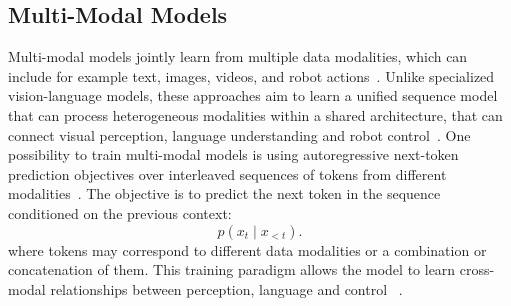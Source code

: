 \subsection{Multi-Modal Models}
\label{sec:MulitModalModelsExtractingFoundationalKnowledgeFromVideos}
Multi-modal models jointly learn from multiple data modalities, which can include for example text, images, videos, and robot actions~\cite{Reed2022AGA}. Unlike specialized vision-language models, these approaches aim to learn a unified sequence model that can process heterogeneous modalities within a shared architecture, that can connect visual perception, language understanding and robot control~\cite{Yin2023ASO, Kawaharazuka2025VisionLanguageActionMF}.
One possibility to train multi-modal models is using autoregressive next-token prediction objectives over interleaved sequences of tokens from different modalities~\cite{Yin2023ASO}. 
The objective is to predict the next token in the sequence conditioned on the previous context:
\begin{equation}
p(x_t \mid x_{<t}).
\end{equation}
where tokens may correspond to different data modalities or a combination or concatenation of them. This training paradigm allows the model to learn cross-modal relationships between perception, language and control ~\cite{Yin2023ASO}.




